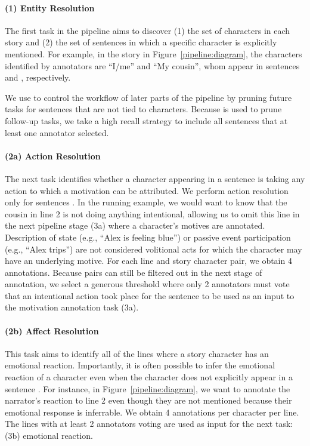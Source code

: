 \documentclass[11pt,a4paper]{article}
\begin{document}
\paragraph{(1) Entity Resolution}
The first task in the pipeline aims to discover (1) the set of characters  in each story  and (2) the set of sentences  in which a specific character  is explicitly mentioned. For example, in the story in Figure~\ref{pipeline:diagram}, the characters identified by annotators are ``I/me'' and ``My cousin'', whom appear in sentences  and , respectively.

We use  to control the workflow of later parts of the pipeline by pruning future tasks for sentences that are not tied to characters. Because  is used to prune follow-up tasks, we take a high recall strategy to include all sentences that at least one annotator selected.






\paragraph{(2a) Action Resolution} 
The next task identifies whether a character  appearing in a sentence  is taking any action to which a motivation can be attributed. We perform action resolution only for sentences .
In the running example, we would want to know that the cousin in line 2 is not doing anything intentional, allowing us to omit this line in the next pipeline stage (3a) where a character's motives are annotated.
Description of state (e.g., ``Alex is feeling blue'') or passive event participation (e.g., ``Alex trips'') are not considered volitional acts for which the character may have an underlying motive. For each line and story character pair, we obtain 4 annotations. Because pairs can still be filtered out in the next stage of annotation, we select a generous threshold where only 2 annotators must vote that an intentional action took place for the sentence to be used as an input to the motivation annotation task (3a).

\paragraph{(2b) Affect Resolution} 
This task aims to identify all of the lines where a story character  has an emotional reaction. Importantly, it is often possible to infer the emotional reaction of a character  even when the character does not explicitly appear in a sentence . For instance, in Figure~\ref{pipeline:diagram}, we want to annotate the narrator's reaction to line 2 even though they are not mentioned because their emotional response is inferrable.
We obtain 4 annotations per character per line.  The lines with at least 2 annotators voting are used as input for the next task: (3b) emotional reaction.
\end{document}
